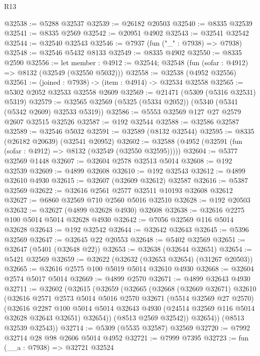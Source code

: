 \begin{lexlean}{R13}
\begin{coremodule}
@32538 := @5288 @32537
@32539 := @26182 @20503
@32540 := @8335 @32539
@32541 := @8335 @2569
@32542 := @20951 @4902
@32543 := @32541 @32542
@32544 := @32540 @32543
@32546 := @7937 (fun ("_" : @7938) => @7938)
@32548 := @32546 @5432 @8133
@32549 := @8335 @4902
@32550 := @8335 @2590
@32556 := let member : @4912 := @32544;
  @32548 (fun (sofar : @4912) => @8132 (@32549 (@32550 @5032)))
@32558 := @32538 (@4952 @32556)
@32561 := (joined : @7938) -> (item : @4914) -> @32534 @32558
@32565 := @5302 @2052 @32533 @32558 @2609
@32569 := @21471 (@5309 (@5316 @32531) @5319)
@32579 := @32565 @32569 (@5325 (@5334 @2052)) (@5340 (@5341 (@5342 @2609) @32533 @5319))
@32586 := @5553 @32569 @127 @27 @2579 @2607 @32515 @32526
@32587 := @192 @32544
@32588 := @32586 @32587
@32589 := @32546 @5032
@32591 := @32589 (@8132 @32544)
@32595 := @8335 (@26182 @20639) (@32541 @20952)
@32602 := @32588 (@4952 (@32591 (fun (sofar : @4912) => @8132 (@32549 (@32550 @32595)))))
@32604 := @5377 @32569 @1448
@32607 := @32604 @2578 @32513 @5014
@32608 := @192 @32539
@32609 := @4899 @32608
@32610 := @192 @32543
@32612 := @4899 @32610 @4930
@32615 := @32607 (@32609 @32612) @32587
@32616 := @5387 @32569
@32622 := @32616 @2561 @2577 @32511 @10193 @32608 @32612
@32627 := @6860 @32569 @710 @2560 @5016 @32510
@32628 := @192 @20503
@32632 := @32627 (@4899 @32628 @4930) @32608
@32638 := @32616 @2275 @100 @5014 @5014 @32628 @4930
@32642 := @7056 @32569 @116 @5014 @32628
@32643 := @192 @32542
@32644 := @32642 @32643
@32645 := @5396 @32569
@32647 := @32645 @22 @20553
@32648 := @5402 @32569
@32651 := @32647 (@5401 (@32648 @22))
@32653 := @32638 (@32644 @32651)
@32654 := @5421 @32569
@32659 := @32622 (@32632 (@32653 @32654) (@31267 @20503))
@32665 := @32616 @2575 @100 @5019 @5014 @32610 @4930
@32668 := @32604 @2574 @5017 @5014
@32669 := @4899 @2570
@32671 := @4899 @32643 @4930
@32711 := @32602
    (@32615
      (@32659
        (@32665
          (@32668
            (@32669 @32671)
            @32610
            (@32616
              @2571
              @2573
              @5014
              @5016
              @2570
              @32671
              (@5514 @32569 @27 @2570)
              (@32616
                @2287
                @100
                @5014
                @5014
                @32643
                @4930
                (@24514 @32569 @116 @5014 @32628 @32643 @32651)
                @32654))
            (@8513 @2569 @32542))
          @32654))
      (@8513 @32539 @32543))
@32714 := @5309 (@5535 @32587) @32569
@32720 := @7992 @32714 @28 @98 @2606 @5014 @4952
@32721 := @7999 @7395
@32723 := fun (__a : @7938) => @32721 @32524

\end{coremodule}
\end{lexlean}
